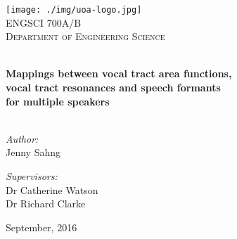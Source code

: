 \begin{titlepage}
\vbox{ }

\vbox{ }

\begin{center}

\texttt{[image: ./img/uoa-logo.jpg]}\\[1cm]
\textsc{\LARGE ENGSCI 700A/B}\\[1.5cm]
\textsc{\Large Department of Engineering Science}\\[0.5cm]

\vbox{ }

\HRule \\[0.6cm]
{\LARGE \bfseries Mappings between vocal tract area functions, \\[0.1cm]
vocal tract resonances and speech formants \\[0.3cm]
for multiple speakers}\\[0.6cm]
\HRule \\[1.5cm]

\begin{minipage}{0.4\textwidth}
\begin{flushleft} \large
\emph{Author:}\\
Jenny Sahng
\end{flushleft}
\end{minipage}
\begin{minipage}{0.4\textwidth}
\begin{flushright} \large
\emph{Supervisors:} \\
Dr Catherine Watson\\
Dr Richard Clarke
\end{flushright}
\end{minipage}
\vfill

{\large September, 2016}
\end{center}
\end{titlepage}